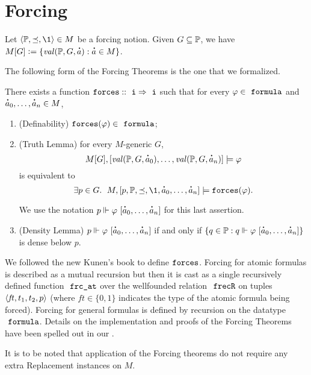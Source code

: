 \section{Forcing}
\label{sec:forcing}
Let $\lb \PP, {\preceq} ,\1\rb \in M$ be a forcing notion. Given $G\subseteq \mathbb{P}$, we have
$M[G]\defi \{ \val(\PP,G,\punto{a}) : \punto{a}\in M \}$.

The following form of the Forcing Theorems  is the one
that we formalized.
\begin{theorem}
  There exists a function  $\forceisa:: \tyi \fun  \tyi$
  such that for every
  $\phi\in\formula$ and $\punto{a}_0,\dots,\punto{a}_n\in M$,
  \begin{enumerate}
  \item (Definability) $\forceisa(\phi)\in\formula$;
  \item (Truth Lemma) for every $M$-generic $G$,
    \[
      M[G], [\val(\PP,G,\punto{a}_0),\dots,\val(\PP,G,\punto{a}_n)]
      \models \phi
    \]
    is equivalent to 
    \[
      \exists p\in G.\ \; M, [p,\PP,\preceq,\1, \punto{a}_0,\dots,\punto{a}_n]  \models
      \forceisa(\phi).\]

    We use the notation $p \forces
    \phi\ [\punto{a}_0,\dots,\punto{a}_n]$ for this last assertion.
  \item (Density Lemma) $p \forces \phi\ [\punto{a}_0,\dots,\punto{a}_n]$
    if and only if 
    $\{q\in \PP :  q \forces \phi\ [\punto{a}_0,\dots,\punto{a}_n]\}$
    is dense below $p$.
  \end{enumerate}
\end{theorem}

We followed the new Kunen's book to define
$\mathop{\mathtt{forces}}$.  Forcing for atomic formulas is described as a mutual
recursion
but then \cite[p.~257]{kunen2011set} it is cast as a single
recursively defined function $\frcat$ over the wellfounded relation
$\isatt{frecR}$ on tuples $\langle \mathit{ft},t_1,t_2,p\rangle$ (where
$\mathit{ft}\in\{0,1\}$ indicates the type of the atomic formula being
forced). Forcing for general formulas is defined by recursion on the
datatype $\formula$. Details on the implementation and proofs of the
Forcing Theorems have been spelled out in our
\cite{2020arXiv200109715G}.


It is to be noted that application of the Forcing theorems do not
require any extra Replacement instances on $M$.

